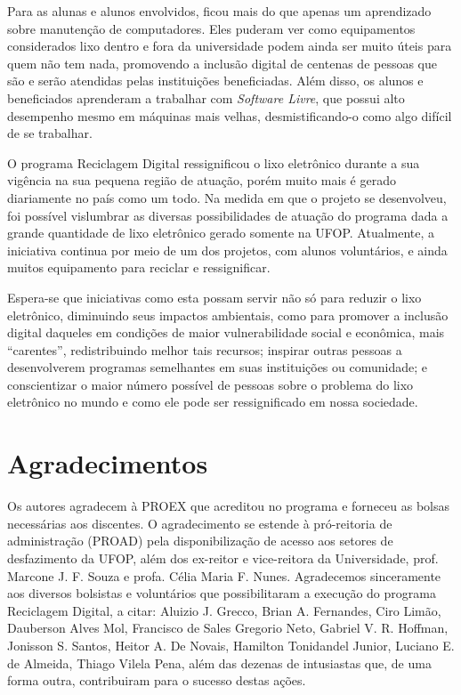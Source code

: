 \documentclass[a4paper]{ifacconf}
\begin{document}
Para as alunas e alunos envolvidos, ficou mais do que apenas um aprendizado sobre manutenção de computadores. Eles puderam ver como equipamentos considerados lixo dentro e fora da universidade podem ainda ser muito úteis para quem não tem nada, promovendo a inclusão digital de centenas de pessoas que são e serão atendidas pelas instituições beneficiadas. Além disso, os alunos e beneficiados aprenderam a trabalhar com \textit{Software Livre}, que possui alto desempenho mesmo em máquinas mais velhas, desmistificando-o como algo difícil de se trabalhar.

O programa Reciclagem Digital ressignificou o lixo eletrônico durante a sua vigência na sua pequena região de atuação, porém muito mais é gerado diariamente no país como um todo. Na medida em que o projeto se desenvolveu, foi possível vislumbrar as diversas possibilidades de atuação do programa dada a grande quantidade de lixo eletrônico gerado somente na UFOP. Atualmente, a iniciativa continua por meio de um dos projetos, com alunos voluntários, e ainda muitos equipamento para reciclar e ressignificar.

Espera-se que iniciativas como esta possam servir não só para reduzir o lixo eletrônico, diminuindo seus impactos ambientais, como para promover a inclusão digital daqueles em condições de maior vulnerabilidade social e econômica, mais ``carentes'', redistribuindo melhor tais recursos; inspirar outras pessoas a desenvolverem programas semelhantes em suas instituições ou comunidade; e conscientizar o maior número possível de pessoas sobre o problema do lixo eletrônico no mundo e como ele pode ser ressignificado em nossa sociedade.

\section*{Agradecimentos}
Os autores agradecem à PROEX que acreditou no programa e forneceu as bolsas necessárias aos discentes. O agradecimento se estende à pró-reitoria de administração (PROAD) pela disponibilização de acesso aos setores de desfazimento da UFOP, além dos ex-reitor e vice-reitora da Universidade, prof. Marcone J. F. Souza e profa. Célia Maria F. Nunes. Agradecemos sinceramente aos diversos bolsistas e voluntários que possibilitaram a execução do programa Reciclagem Digital, a citar: Aluizio J. Grecco, Brian A. Fernandes, Ciro Limão, Dauberson Alves Mol, Francisco de Sales Gregorio Neto, Gabriel V. R. Hoffman, Jonisson S. Santos, Heitor A. De Novais, Hamilton Tonidandel Junior, Luciano E. de Almeida, Thiago Vilela Pena, além das dezenas de intusiastas que, de uma forma outra, contribuiram para o sucesso destas ações.
                                                                  
\end{document}
